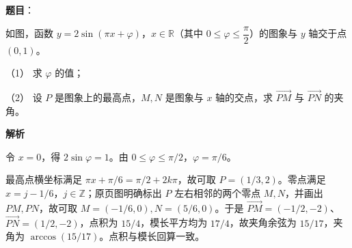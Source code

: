 \begin{answer}

\textbf{题目}：

如图，函数 $y=2\sin(\pi x+\varphi)$，$x\in\mathbb R$（其中 $0\leqslant\varphi\leqslant\dfrac\pi2$）的图象与 $y$ 轴交于点 $(0,1)$。

（1） 求 $\varphi$ 的值；

（2） 设 $P$ 是图象上的最高点，$M,N$ 是图象与 $x$ 轴的交点，求 $\overrightarrow{PM}$ 与 $\overrightarrow{PN}$ 的夹角。
\nopagebreak[4]
\begin{center}\end{center}
\nopagebreak[4]
\textbf{解析}


令 $x=0$，得 $2\sin\varphi=1$。由 $0\le\varphi\le\pi/2$，$\varphi=\pi/6$。


最高点横坐标满足 $\pi x+\pi/6=\pi/2+2k\pi$，故可取 $P=(1/3,2)$。零点满足 $x=j-1/6$，$j\in\mathbb Z$；原页图明确标出 $P$ 左右相邻的两个零点 $M,N$，并画出 $PM,PN$，故可取 $M=(-1/6,0),N=(5/6,0)$。于是 $\overrightarrow{PM}=(-1/2,-2)$、$\overrightarrow{PN}=(1/2,-2)$，点积为 $15/4$，模长平方均为 $17/4$，故夹角余弦为 $15/17$，夹角为 $\arccos(15/17)$。点积与模长回算一致。



\end{answer}
